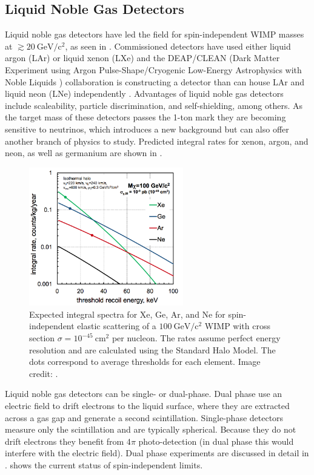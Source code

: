 \subsection{Liquid Noble Gas Detectors} \label{subsec:noble_gas}
Liquid noble gas detectors have led the field for spin-independent WIMP masses at $\gtrsim 20\ \mathrm{GeV/c^2}$, as seen in
.  Commissioned detectors have
used either liquid argon (LAr) or liquid xenon (LXe) and the DEAP/CLEAN
(Dark Matter Experiment using Argon Pulse-Shape/Cryogenic Low-Energy Astrophysics with Noble Liquids ) collaboration is constructing a
detector than can house
LAr and liquid neon (LNe) independently .  Advantages of liquid noble gas detectors
include scaleability, particle discrimination, and self-shielding, among others.  As the target mass of these detectors passes
the 1-ton mark they are becoming sensitive to neutrinos, which introduces a new background but can also offer another branch of physics to
study.  Predicted integral rates for xenon, argon, and neon, as well as germanium are shown in .

\begin{figure}
\centering
\includegraphics[width=0.6\textwidth]{IntegralRateTargets}
\caption{Expected integral spectra for Xe, Ge, Ar, and Ne for spin-independent elastic scattering of a $100\ \mathrm{GeV/c^2}$ WIMP with
cross section $\sigma = 10^{-45}\ \mathrm{cm^{2}}$ per nucleon.  The rates assume perfect energy resolution and are calculated using the
Standard Halo Model.  The dots correspond to average thresholds for each element.  Image credit: .}
\label{fig:material_wimp_rate}
\end{figure}

Liquid noble gas detectors can be single- or dual-phase.  Dual phase use an electric field to drift electrons to the liquid surface, where
they are extracted across a gas gap and generate a second scintillation.  Single-phase detectors measure only the scintillation and are
typically
spherical.  Because they do not drift electrons they benefit from 4$\pi$ photo-detection (in dual phase this would interfere with the
electric field).  Dual phase experiments are discussed in detail in .   shows the
current status of spin-independent limits.

